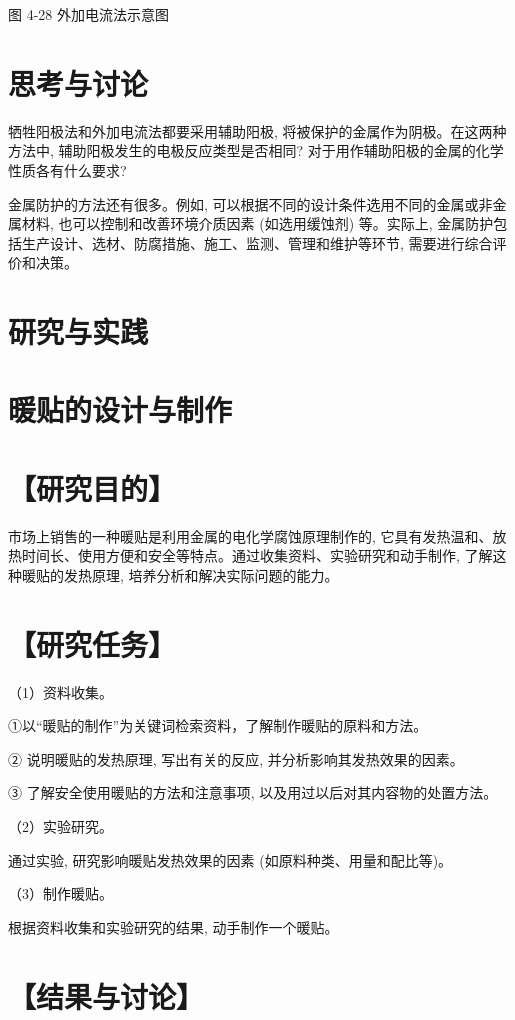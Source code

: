 \documentclass[10pt]{article}
\begin{document}
图 4-28 外加电流法示意图

\section*{思考与讨论}

牺牲阳极法和外加电流法都要采用辅助阳极, 将被保护的金属作为阴极。在这两种方法中, 辅助阳极发生的电极反应类型是否相同? 对于用作辅助阳极的金属的化学性质各有什么要求?

金属防护的方法还有很多。例如, 可以根据不同的设计条件选用不同的金属或非金属材料, 也可以控制和改善环境介质因素 (如选用缓蚀剂) 等。实际上, 金属防护包括生产设计、选材、防腐措施、施工、监测、管理和维护等环节, 需要进行综合评价和决策。

\section*{研究与实践}

\section*{暖贴的设计与制作}

\section*{【研究目的】}

市场上销售的一种暖贴是利用金属的电化学腐蚀原理制作的, 它具有发热温和、放热时间长、使用方便和安全等特点。通过收集资料、实验研究和动手制作, 了解这种暖贴的发热原理, 培养分析和解决实际问题的能力。

\section*{【研究任务】}

（1）资料收集。

①以“暖贴的制作”为关键词检索资料，了解制作暖贴的原料和方法。

② 说明暖贴的发热原理, 写出有关的反应, 并分析影响其发热效果的因素。

③ 了解安全使用暖贴的方法和注意事项, 以及用过以后对其内容物的处置方法。

（2）实验研究。

通过实验, 研究影响暖贴发热效果的因素 (如原料种类、用量和配比等)。

（3）制作暖贴。

根据资料收集和实验研究的结果, 动手制作一个暖贴。

\section*{【结果与讨论】}
\end{document}
